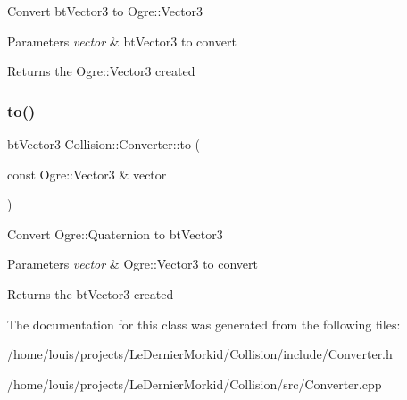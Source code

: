 Convert bt\+Vector3 to Ogre\+::\+Vector3 
\begin{DoxyParams}{Parameters}
{\em vector} & bt\+Vector3 to convert \\
\hline
\end{DoxyParams}
\begin{DoxyReturn}{Returns}
the Ogre\+::\+Vector3 created 
\end{DoxyReturn}
\mbox{\label{class_collision_1_1_converter_a38f61c45f9f05299d3152c729614252c}} 
\subsubsection{\texorpdfstring{to()}{to()}\hspace{0.1cm}{\footnotesize\ttfamily [6/6]}}
{\footnotesize\ttfamily bt\+Vector3 Collision\+::\+Converter\+::to (\begin{DoxyParamCaption}\item[{const Ogre\+::\+Vector3 \&}]{vector }\end{DoxyParamCaption})\hspace{0.3cm}{\ttfamily [static]}}

Convert Ogre\+::\+Quaternion to bt\+Vector3 
\begin{DoxyParams}{Parameters}
{\em vector} & Ogre\+::\+Vector3 to convert \\
\hline
\end{DoxyParams}
\begin{DoxyReturn}{Returns}
the bt\+Vector3 created 
\end{DoxyReturn}


The documentation for this class was generated from the following files\+:\begin{DoxyCompactItemize}
\item 
/home/louis/projects/\+Le\+Dernier\+Morkid/\+Collision/include/Converter.\+h\item 
/home/louis/projects/\+Le\+Dernier\+Morkid/\+Collision/src/Converter.\+cpp\end{DoxyCompactItemize}
